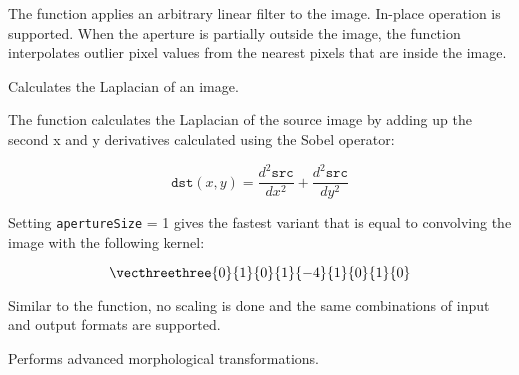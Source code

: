 The function applies an arbitrary linear filter to the image. In-place operation is supported. When the aperture is partially outside the image, the function interpolates outlier pixel values from the nearest pixels that are inside the image.

Calculates the Laplacian of an image.

\begin{description}
\end{description}

The function calculates the Laplacian of the source image by adding up the second x and y derivatives calculated using the Sobel operator:

\[
\texttt{dst}(x,y) = \frac{d^2 \texttt{src}}{dx^2} + \frac{d^2 \texttt{src}}{dy^2}
\]

Setting \texttt{apertureSize} = 1 gives the fastest variant that is equal to convolving the image with the following kernel:

\[ \vecthreethree {0}{1}{0}{1}{-4}{1}{0}{1}{0} \]

Similar to the  function, no scaling is done and the same combinations of input and output formats are supported.

Performs advanced morphological transformations.


\begin{description}
\begin{description}
\end{description}
\end{description}

